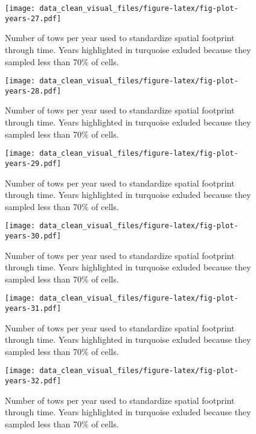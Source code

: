\documentclass[
]{article}
\begin{document}
\begin{figure}
\centering
\texttt{[image: data\_clean\_visual\_files/figure-latex/fig-plot-years-27.pdf]}
\caption{\label{fig:fig-plot-years-27}Number of tows per year used to standardize spatial footprint through time. Years highlighted in turquoise exluded because they sampled less than 70\% of cells.}
\end{figure}

\begin{figure}
\centering
\texttt{[image: data\_clean\_visual\_files/figure-latex/fig-plot-years-28.pdf]}
\caption{\label{fig:fig-plot-years-28}Number of tows per year used to standardize spatial footprint through time. Years highlighted in turquoise exluded because they sampled less than 70\% of cells.}
\end{figure}

\begin{figure}
\centering
\texttt{[image: data\_clean\_visual\_files/figure-latex/fig-plot-years-29.pdf]}
\caption{\label{fig:fig-plot-years-29}Number of tows per year used to standardize spatial footprint through time. Years highlighted in turquoise exluded because they sampled less than 70\% of cells.}
\end{figure}

\begin{figure}
\centering
\texttt{[image: data\_clean\_visual\_files/figure-latex/fig-plot-years-30.pdf]}
\caption{\label{fig:fig-plot-years-30}Number of tows per year used to standardize spatial footprint through time. Years highlighted in turquoise exluded because they sampled less than 70\% of cells.}
\end{figure}

\begin{figure}
\centering
\texttt{[image: data\_clean\_visual\_files/figure-latex/fig-plot-years-31.pdf]}
\caption{\label{fig:fig-plot-years-31}Number of tows per year used to standardize spatial footprint through time. Years highlighted in turquoise exluded because they sampled less than 70\% of cells.}
\end{figure}

\begin{figure}
\centering
\texttt{[image: data\_clean\_visual\_files/figure-latex/fig-plot-years-32.pdf]}
\caption{\label{fig:fig-plot-years-32}Number of tows per year used to standardize spatial footprint through time. Years highlighted in turquoise exluded because they sampled less than 70\% of cells.}
\end{figure}
\end{document}
